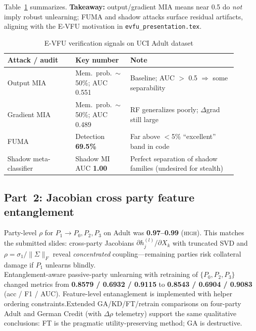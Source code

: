 \documentclass[sigconf,nonacm]{acmart}
\begin{document}
Table~\ref{tab:evfu} summarizes. \textbf{Takeaway:} output/gradient MIA means near 0.5 do \emph{not} imply robust unlearning; FUMA and shadow attacks surface residual artifacts, aligning with the E-VFU motivation in \texttt{evfu\_presentation.tex}.

\begin{table}[t]
  \caption{E-VFU verification signals on UCI Adult dataset}
  \label{tab:evfu}
  \centering
  \small
  \begin{tabular}{@{}p{0.28\linewidth}p{0.20\linewidth}p{0.44\linewidth}@{}}
    \toprule
    Attack / audit & Key number & Note \\
    \midrule
    Output MIA & Mem.\ prob.\ $\sim$50\%; AUC 0.551 & Baseline; AUC $>$ 0.5 $\Rightarrow$ some separability \\
    Gradient MIA & Mem.\ prob.\ $\sim$50\%; AUC 0.489 & RF generalizes poorly; $\Delta$grad still large \\
    FUMA & Detection \textbf{69.5\%} & Far above $<$5\% ``excellent'' band in code \\
    Shadow meta-classifier & Shadow MI AUC \textbf{1.00} & Perfect separation of shadow families (undesired for stealth) \\
    \bottomrule
  \end{tabular}
\end{table}

\subsection{Part~2: Jacobian cross party feature entanglement }
Party-level $\rho$ for $P_1\!\to\!P_0,P_2,P_3$ on Adult was \textbf{0.97--0.99} (\textsc{high}). This matches the submitted slides: cross-party Jacobians $\partial h_j^{(l)}/\partial X_k$ with truncated SVD and $\rho=\sigma_1/\|\Sigma\|_F$ reveal \emph{concentrated} coupling---remaining parties risk collateral damage if $P_1$ unlearns blindly.\\

 Entanglement-aware passive-party unlearning with retraining of $\{P_0,P_2,P_3\}$ changed metrics from \textbf{0.8579 / 0.6932 / 0.9115} to \textbf{0.8543 / 0.6904 / 0.9083} (acc / F1 / AUC).  Feature-level entanaglement is implemented with helper ordering constraints.Extended GA/KD/FT/retrain comparisons on four-party Adult and German Credit (with $\Delta\rho$ telemetry) support the same qualitative conclusions: FT is the pragmatic utility-preserving method; GA is destructive.\\
\end{document}
